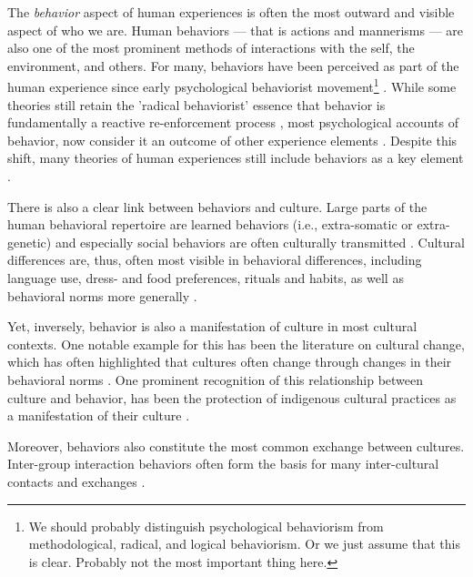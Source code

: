 \documentclass[nobib]{tufte-handout}
\begin{document}
The \textit{behavior} aspect of human experiences is often the most outward and visible aspect of who we are. Human behaviors --- that is actions and mannerisms --- are also one of the most prominent methods of interactions with the self, the environment, and others. For many, behaviors have been perceived as part of the human experience since early psychological behaviorist movement\footnote{We should probably distinguish psychological behaviorism from methodological, radical, and logical behaviorism. Or we just assume that this is clear. Probably not the most important thing here.} \citep[e.g.,][]{Syngg1949}. While some theories still retain the 'radical behaviorist' essence that behavior is fundamentally a reactive re-enforcement process \citep[largely learning and habit theories; e.g.,][]{Hayes2001}, most psychological accounts of behavior, now consider it an outcome of other experience elements \citep[e.g.,][]{Ajzen2019}. Despite this shift, many theories of human experiences still include behaviors as a key element \citep[e.g.,][]{Breckler1984, VanHarreveld2015, Ben-Eliyahu2015}.

There is also a clear link between behaviors and culture. Large parts of the human behavioral repertoire are learned behaviors (i.e., extra-somatic or extra-genetic) and especially social behaviors are often culturally transmitted \citep{Legare2019, Whiting1980}. Cultural differences are, thus, often most visible in behavioral differences, including language use, dress- and food preferences, rituals and habits, as well as behavioral norms more generally \citep[e.g., social norms, as well as formal rules and laws; e.g.,][]{Hofstede2001}. 

Yet, inversely, behavior is also a manifestation of culture in most cultural contexts. One notable example for this has been the literature on cultural change, which has often highlighted that cultures often change through changes in their behavioral norms \citep[e.g.,][]{Varnum2017}. One prominent recognition of this relationship between culture and behavior, has been the protection of indigenous cultural practices as a manifestation of their culture \citep[Art. 11]{UnitedNations2007}. 

Moreover, behaviors also constitute the most common exchange between cultures. Inter-group interaction behaviors often form the basis for many inter-cultural contacts and exchanges \citep{Maxwell2017, Sam2010}. 
\end{document}

